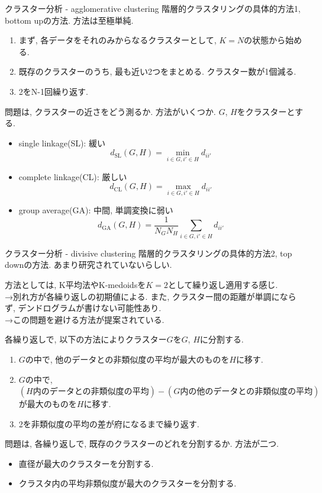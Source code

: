 \documentclass[dvipdfmx,8pt]{beamer}
\begin{document}
  \begin{frame}{クラスター分析 - agglomerative clustering}
    階層的クラスタリングの具体的方法1, bottom upの方法.
    方法は至極単純.

    \begin{enumerate}
      \item まず, 各データをそれのみからなるクラスターとして, $K=N$の状態から始める.
      \item 既存のクラスターのうち, 最も近い2つをまとめる. クラスター数が1個減る.
      \item 2をN-1回繰り返す.
    \end{enumerate}

    問題は, クラスターの近さをどう測るか. 方法がいくつか. $G$, $H$をクラスターとする.
    \begin{itemize}
      \item single linkage(SL): 緩い
        \[
          d_{\mathrm{SL}}(G,H)=\min_{i\in G, i'\in H}d_{ii'}
        \]
      \item complete linkage(CL): 厳しい
        \[
          d_{\mathrm{CL}}(G,H)=\max_{i\in G, i'\in H}d_{ii'}
        \]
      \item group average(GA): 中間, 単調変換に弱い
        \[
          d_{\mathrm{GA}}(G,H)=\frac{1}{N_GN_H}\sum_{i \in G, i'\in H}d_{ii'}
        \]
    \end{itemize}
  \end{frame}
  \begin{frame}{クラスター分析 - divisive clustering}
    階層的クラスタリングの具体的方法2, top downの方法.
    あまり研究されていないらしい.

    方法としては, K平均法やK-medoidsを$K=2$として繰り返し適用する感じ. \\
    →別れ方が各繰り返しの初期値による.
    また, クラスター間の距離が単調にならず, デンドログラムが書けない可能性あり. \\
    →この問題を避ける方法が提案されている.

    各繰り返しで, 以下の方法によりクラスター$G$を$G$, $H$に分割する.
    \begin{enumerate}
      \item $G$の中で, 他のデータとの非類似度の平均が最大のものを$H$に移す.
      \item $G$の中で, $(H\mbox{内のデータとの非類似度の平均})-(G\mbox{内の他のデータとの非類似度の平均})$が最大のものを$H$に移す.
      \item 2を非類似度の平均の差が府になるまで繰り返す.
    \end{enumerate}

    問題は, 各繰り返しで, 既存のクラスターのどれを分割するか. 方法が二つ.
    \begin{itemize}
      \item 直径が最大のクラスターを分割する.
      \item クラスタ内の平均非類似度が最大のクラスターを分割する.
    \end{itemize}
  \end{frame}
\end{document}
